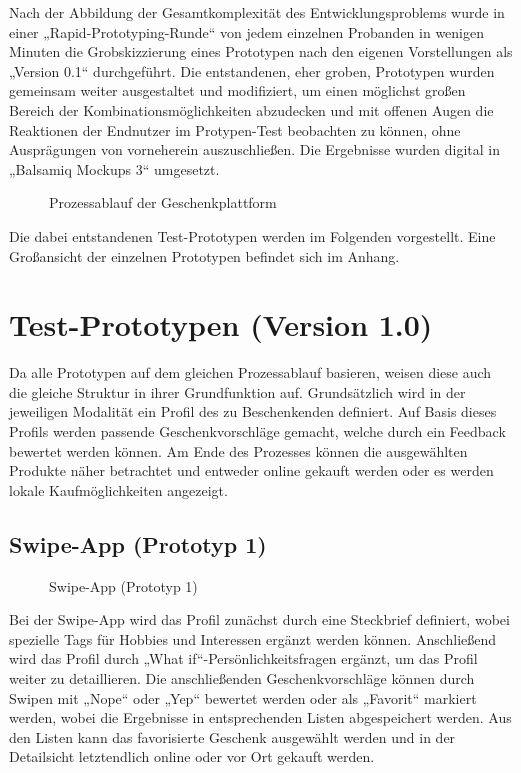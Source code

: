 \documentclass[12pt,ngerman, fleqn]{book} %
\begin{document}
Nach der Abbildung der Gesamtkomplexität des Entwicklungsproblems wurde in einer „Rapid-Prototyping-Runde“ von jedem einzelnen Probanden in wenigen Minuten die Grobskizzierung eines Prototypen nach den eigenen Vorstellungen als „Version 0.1“ durchgeführt. Die entstandenen, eher groben, Prototypen wurden gemeinsam weiter ausgestaltet und modifiziert, um einen möglichst großen Bereich der Kombinationsmöglichkeiten abzudecken und mit offenen Augen die Reaktionen der Endnutzer im Protypen-Test beobachten zu können, ohne Ausprägungen von vorneherein auszuschließen. Die Ergebnisse wurden digital in „Balsamiq Mockups 3“ umgesetzt.

\begin{figure}[ht]
    \centering
    \caption{Prozessablauf der Geschenkplattform}
    \label{fig:peter}
\end{figure}

Die dabei entstandenen Test-Prototypen werden im Folgenden vorgestellt. Eine Großansicht der einzelnen Prototypen befindet sich im Anhang. 

\section{Test-Prototypen (Version 1.0)}
Da alle Prototypen auf dem gleichen Prozessablauf basieren, weisen diese auch die gleiche Struktur in ihrer Grundfunktion auf. Grundsätzlich wird in der jeweiligen Modalität ein Profil des zu Beschenkenden definiert. Auf Basis dieses Profils werden passende Geschenkvorschläge gemacht, welche durch ein Feedback bewertet werden können. Am Ende des Prozesses können die ausgewählten Produkte näher betrachtet und entweder online gekauft werden oder es werden lokale Kaufmöglichkeiten angezeigt.

\subsection{Swipe-App (Prototyp 1)}
\begin{figure}[ht]
    \centering
    \caption{Swipe-App (Prototyp 1)}
    \label{fig:proto1}
\end{figure}

Bei der Swipe-App wird das Profil zunächst durch eine Steckbrief definiert, wobei spezielle Tags für Hobbies und Interessen ergänzt werden können. Anschließend wird das Profil durch „What if“-Persönlichkeitsfragen ergänzt, um das Profil weiter zu detaillieren. Die anschließenden Geschenkvorschläge können durch Swipen mit „Nope“ oder „Yep“ bewertet werden oder als „Favorit“ markiert werden, wobei die Ergebnisse in entsprechenden Listen abgespeichert werden. Aus den Listen kann das favorisierte Geschenk ausgewählt werden und in der Detailsicht letztendlich online oder vor Ort gekauft werden. 
\end{document}
